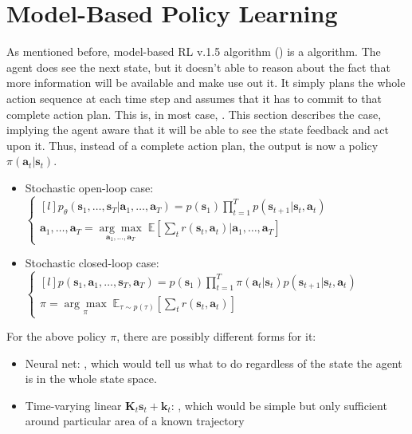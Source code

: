 \chapter{Model-Based Policy Learning}
As mentioned before, model-based \ac{RL} v.1.5 algorithm () is a  algorithm. The agent does see the next state, but it doesn't able to reason about the fact that more information will be available and make use out it. It simply plans the whole action sequence at each time step and assumes that it has to commit to that complete action plan. This is, in most case, . This section describes the  case, implying the agent aware that it will be able to see the state feedback and act upon it. Thus, instead of a complete action plan, the output is now a policy $\pi(\textbf{a}_t | \textbf{s}_t)$.

\begin{itemize}
	\item Stochastic open-loop case:\quad $\left\{\begin{matrix*}[l]
		\displaystyle p_\theta(\textbf{s}_1, \dots, \textbf{s}_T | \textbf{a}_1, \dots, \textbf{a}_T) = p(\textbf{s}_1) \prod_{t=1}^T p(\textbf{s}_{t+1} | \textbf{s}_t, \textbf{a}_t)\\
		\displaystyle \textbf{a}_1, \dots, \textbf{a}_T = \underset{\textbf{a}_1, \dots, \textbf{a}_T}{\arg\max}\; \mathbb{E} \left[ \sum_t r(\textbf{s}_t, \textbf{a}_t) | \textbf{a}_1, \dots, \textbf{a}_T \right]
	\end{matrix*}\right.$
	\item Stochastic closed-loop case:\quad $\left\{ \begin{matrix*}[l]
		\displaystyle p(\textbf{s}_1, \textbf{a}_1, \dots, \textbf{s}_T, \textbf{a}_T) = p(\textbf{s}_1) \prod_{t=1}^T \pi(\textbf{a}_t | \textbf{s}_t) p(\textbf{s}_{t+1} | \textbf{s}_t, \textbf{a}_t)\\
		\displaystyle \pi = \underset{\pi}{\arg\max}\; \mathbb{E}_{\tau \sim p(\tau)} \left[ \sum_t r(\textbf{s}_t, \textbf{a}_t) \right]
	\end{matrix*} \right.$
\end{itemize}

For the above policy $\pi$, there are possibly different forms for it:
\begin{itemize}
	\item Neural net: , which would tell us what to do regardless of the state the agent is in the whole state space.
	\item Time-varying linear $\textbf{K}_t \textbf{s}_t + \textbf{k}_t$: , which would be simple but only sufficient around particular area of a known trajectory
\end{itemize}

